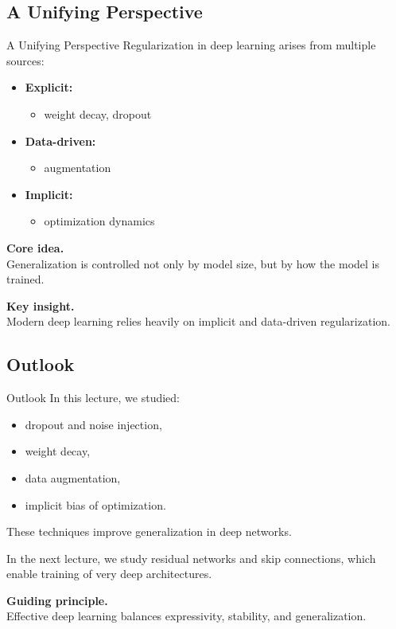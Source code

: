 \documentclass[aspectratio=169,11pt]{beamer}
\begin{document}
\subsection{A Unifying Perspective}
\begin{frame}[t,allowframebreaks]{A Unifying Perspective}
\small
Regularization in deep learning arises from multiple sources:

\begin{itemize}
    \item \textbf{Explicit:}\\ \begin{itemize}
        \item weight decay, dropout
    \end{itemize}

    \item \textbf{Data-driven:}\\ \begin{itemize}
        \item augmentation
    \end{itemize}

    \item \textbf{Implicit:}\\ \begin{itemize}
        \item optimization dynamics
    \end{itemize}
\end{itemize}

\textbf{Core idea.}\\ Generalization is controlled not only by model size, but by how the model is trained.

\textbf{Key insight.}\\ Modern deep learning relies heavily on implicit and data-driven regularization.
\end{frame}

\subsection{Outlook}
\begin{frame}[t,allowframebreaks]{Outlook}
\small
In this lecture, we studied:

\begin{itemize}
    \item dropout and noise injection,
    \item weight decay,
    \item data augmentation,
    \item implicit bias of optimization.
\end{itemize}

These techniques improve generalization in deep networks.

In the next lecture, we study residual networks and skip connections, which enable training of very deep architectures.

\textbf{Guiding principle.}\\ Effective deep learning balances expressivity, stability, and generalization.
\end{frame}
\end{document}
